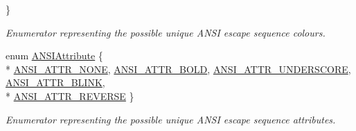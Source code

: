 \begin{DoxyCompactItemize}
 \}
\begin{DoxyCompactList}\small\item\em Enumerator representing the possible unique A\-N\-S\-I escape sequence colours. \end{DoxyCompactList}\item 
enum \hyperlink{namespacechaos_1_1io_1_1format_af01119682ec0bc616b49641e0c2a7ccf}{A\-N\-S\-I\-Attribute} \{ \\*
\hyperlink{namespacechaos_1_1io_1_1format_af01119682ec0bc616b49641e0c2a7ccfa3154b286513beb167bb516ea15f1cfb5}{A\-N\-S\-I\-\_\-\-A\-T\-T\-R\-\_\-\-N\-O\-N\-E}, 
\hyperlink{namespacechaos_1_1io_1_1format_af01119682ec0bc616b49641e0c2a7ccfaada31e77e1e80ea78e0cd08a126271b3}{A\-N\-S\-I\-\_\-\-A\-T\-T\-R\-\_\-\-B\-O\-L\-D}, 
\hyperlink{namespacechaos_1_1io_1_1format_af01119682ec0bc616b49641e0c2a7ccfa2f1d142ccf489cba5710445abd48555f}{A\-N\-S\-I\-\_\-\-A\-T\-T\-R\-\_\-\-U\-N\-D\-E\-R\-S\-C\-O\-R\-E}, 
\hyperlink{namespacechaos_1_1io_1_1format_af01119682ec0bc616b49641e0c2a7ccfacd3671458d96396a0fec66c993244186}{A\-N\-S\-I\-\_\-\-A\-T\-T\-R\-\_\-\-B\-L\-I\-N\-K}, 
\\*
\hyperlink{namespacechaos_1_1io_1_1format_af01119682ec0bc616b49641e0c2a7ccfaa7b58f4c0365d47d2bc98a4587521806}{A\-N\-S\-I\-\_\-\-A\-T\-T\-R\-\_\-\-R\-E\-V\-E\-R\-S\-E}
 \}
\begin{DoxyCompactList}\small\item\em Enumerator representing the possible unique A\-N\-S\-I escape sequence attributes. \end{DoxyCompactList}\end{DoxyCompactItemize}

